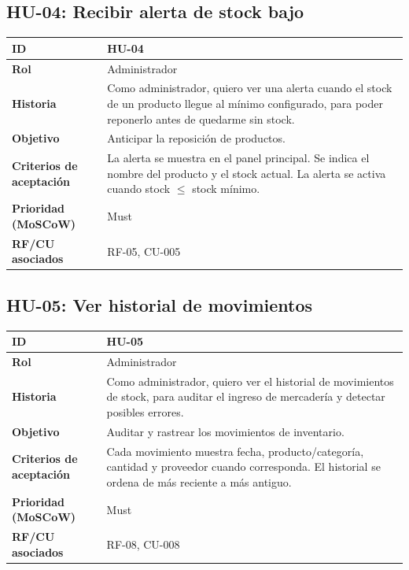 \documentclass[12pt, a4paper]{article}
\begin{document}
\subsection{HU-04: Recibir alerta de stock bajo}
\begin{center}
\renewcommand{\arraystretch}{1.4}
\begin{tabular}{|L{4cm}|L{12cm}|}
\hline
\textbf{ID} & HU-04 \\
\hline
\textbf{Rol} & Administrador \\
\hline
\textbf{Historia} & Como administrador, quiero ver una alerta cuando el stock de un producto llegue al mínimo configurado, para poder reponerlo antes de quedarme sin stock. \\
\hline
\textbf{Objetivo} & Anticipar la reposición de productos. \\
\hline
\textbf{Criterios de aceptación} & La alerta se muestra en el panel principal. Se indica el nombre del producto y el stock actual. La alerta se activa cuando stock $\leq$ stock mínimo. \\
\hline
\textbf{Prioridad (MoSCoW)} & Must \\
\hline
\textbf{RF/CU asociados} & RF-05, CU-005 \\
\hline
\end{tabular}
\end{center}

\subsection{HU-05: Ver historial de movimientos}
\begin{center}
\renewcommand{\arraystretch}{1.4}
\begin{tabular}{|L{4cm}|L{12cm}|}
\hline
\textbf{ID} & HU-05 \\
\hline
\textbf{Rol} & Administrador \\
\hline
\textbf{Historia} & Como administrador, quiero ver el historial de movimientos de stock, para auditar el ingreso de mercadería y detectar posibles errores. \\
\hline
\textbf{Objetivo} & Auditar y rastrear los movimientos de inventario. \\
\hline
\textbf{Criterios de aceptación} & Cada movimiento muestra fecha, producto/categoría, cantidad y proveedor cuando corresponda. El historial se ordena de más reciente a más antiguo. \\
\hline
\textbf{Prioridad (MoSCoW)} & Must \\
\hline
\textbf{RF/CU asociados} & RF-08, CU-008 \\
\hline
\end{tabular}
\end{center}
\end{document}
